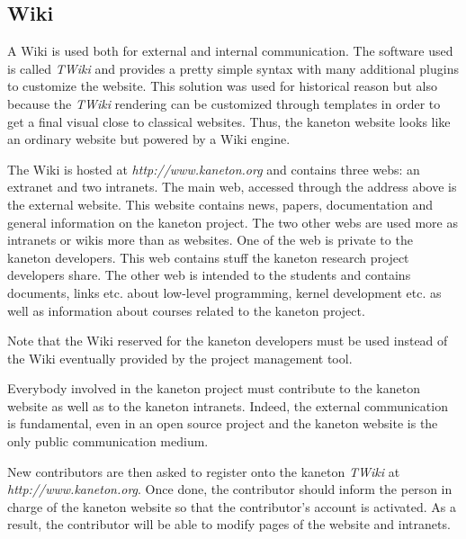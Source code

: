 %
%
%
%
%
%

%
%

\subsection{Wiki}
\label{section:wiki}

A Wiki is used both for external and internal communication. The software
used is called \textit{TWiki} and provides a pretty simple syntax with
many additional plugins to customize the website. This solution was used
for historical reason but also because the \textit{TWiki} rendering can
be customized through templates in order to get a final visual close to
classical websites. Thus, the kaneton website looks like an ordinary
website but powered by a Wiki engine.

The Wiki is hosted at \textit{http://www.kaneton.org} and contains three
webs: an extranet and two intranets. The main web, accessed through the
address above is the external website. This website contains news, papers,
documentation and general information on the kaneton project. The two other
webs are used more as intranets or wikis more than as websites. One of the web
is private to the kaneton developers. This web contains stuff the kaneton
research project developers share. The other web is intended to the
students and contains documents, links etc. about low-level programming, kernel
development etc. as well as information about courses related to the
kaneton project.

Note that the Wiki reserved for the kaneton developers must be used
instead of the Wiki eventually provided by the project management tool.

Everybody involved in the kaneton project must contribute to the kaneton
website as well as to the kaneton intranets. Indeed, the external communication
is fundamental, even in an open source project and the kaneton website is
the only public communication medium.

New contributors are then asked to register onto the kaneton \textit{TWiki}
at \textit{http://www.kaneton.org}. Once done, the contributor should
inform the person in charge of the kaneton website so that  the contributor's
account is activated. As a result, the contributor will be able to modify
pages of the website and intranets.
